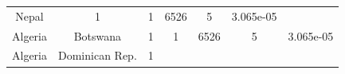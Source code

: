 \documentclass[10pt,]{article}
\begin{document}
\begin{longtable}[]{@{}ccccccc@{}}
\begin{minipage}[t]{0.16\columnwidth}
Nepal\strut
\end{minipage} & \begin{minipage}[t]{0.11\columnwidth}\centering\strut
1\strut
\end{minipage} & \begin{minipage}[t]{0.08\columnwidth}\centering\strut
1\strut
\end{minipage} & \begin{minipage}[t]{0.13\columnwidth}\centering\strut
6526\strut
\end{minipage} & \begin{minipage}[t]{0.10\columnwidth}\centering\strut
5\strut
\end{minipage} & \begin{minipage}[t]{0.10\columnwidth}\centering\strut
3.065e-05\strut
\end{minipage}\tabularnewline
\begin{minipage}[t]{0.11\columnwidth}\centering\strut
Algeria\strut
\end{minipage} & \begin{minipage}[t]{0.16\columnwidth}\centering\strut
Botswana\strut
\end{minipage} & \begin{minipage}[t]{0.11\columnwidth}\centering\strut
1\strut
\end{minipage} & \begin{minipage}[t]{0.08\columnwidth}\centering\strut
1\strut
\end{minipage} & \begin{minipage}[t]{0.13\columnwidth}\centering\strut
6526\strut
\end{minipage} & \begin{minipage}[t]{0.10\columnwidth}\centering\strut
5\strut
\end{minipage} & \begin{minipage}[t]{0.10\columnwidth}\centering\strut
3.065e-05\strut
\end{minipage}\tabularnewline
\begin{minipage}[t]{0.11\columnwidth}\centering\strut
Algeria\strut
\end{minipage} & \begin{minipage}[t]{0.16\columnwidth}\centering\strut
Dominican Rep.\strut
\end{minipage} & \begin{minipage}[t]{0.11\columnwidth}\centering\strut
1\strut
\end{minipage} & \begin{minipage}[t]{0.08\columnwidth}\centering\strut

\end{minipage}
\end{longtable}
\end{document}
